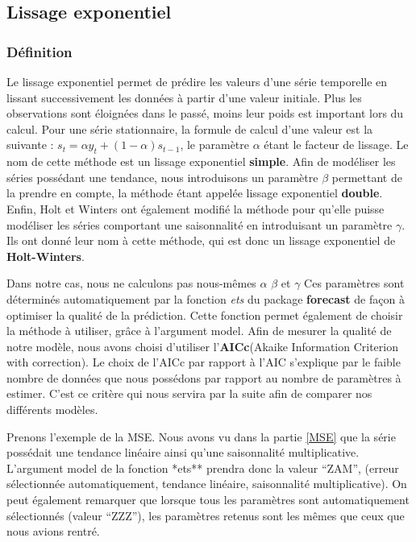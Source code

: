 \documentclass[11pt,]{article}
\begin{document}
\subsection{Lissage exponentiel}\label{lissage-exponentiel}

\subsubsection{Définition}\label{definition}

Le lissage exponentiel permet de prédire les valeurs d'une série
temporelle en lissant successivement les données à partir d'une valeur
initiale. Plus les observations sont éloignées dans le passé, moins leur
poids est important lors du calcul. Pour une série stationnaire, la
formule de calcul d'une valeur est la suivante :
\(s_t = \alpha y_t + (1-\alpha) s_{t-1}\), le paramètre \(\alpha\) étant
le facteur de lissage. Le nom de cette méthode est un lissage
exponentiel \textbf{simple}. Afin de modéliser les séries possédant une
tendance, nous introduisons un paramètre \(\beta\) permettant de la
prendre en compte, la méthode étant appelée lissage exponentiel
\textbf{double}. Enfin, Holt et Winters ont également modifié la méthode
pour qu'elle puisse modéliser les séries comportant une saisonnalité en
introduisant un paramètre \(\gamma\). Ils ont donné leur nom à cette
méthode, qui est donc un lissage exponentiel de \textbf{Holt-Winters}.

Dans notre cas, nous ne calculons pas nous-mêmes \(\alpha\) \(\beta\) et
\(\gamma\) Ces paramètres sont déterminés automatiquement par la
fonction \emph{ets} du package \textbf{forecast} de façon à optimiser la
qualité de la prédiction. Cette fonction permet également de choisir la
méthode à utiliser, grâce à l'argument model. Afin de mesurer la qualité
de notre modèle, nous avons choisi d'utiliser l'\textbf{AICc}(Akaike
Information Criterion with correction). Le choix de l'AICc par rapport à
l'AIC s'explique par le faible nombre de données que nous possédons par
rapport au nombre de paramètres à estimer. C'est ce critère qui nous
servira par la suite afin de comparer nos différents modèles.
\label{AICc}

Prenons l'exemple de la MSE. Nous avons vu dans la partie \ref{MSE} que
la série possédait une tendance linéaire ainsi qu'une saisonnalité
multiplicative. L'argument model de la fonction *ets** prendra donc la
valeur ``ZAM'', (erreur sélectionnée automatiquement, tendance linéaire,
saisonnalité multiplicative). On peut également remarquer que lorsque
tous les paramètres sont automatiquement sélectionnés (valeur ``ZZZ''),
les paramètres retenus sont les mêmes que ceux que nous avions rentré.
\end{document}
